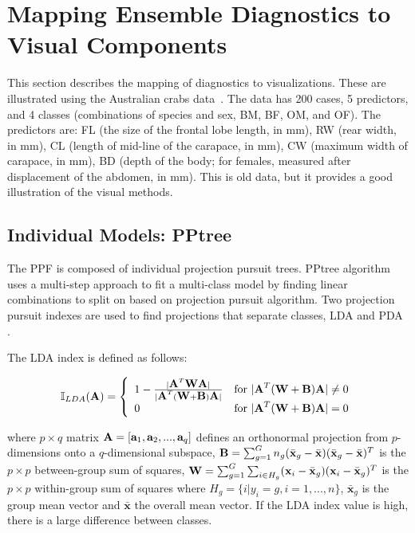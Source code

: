 \documentclass[smallextended,natbib]{svjour3}\usepackage[]{graphicx}\usepackage[]{xcolor}
\newcommand{\blA}{\mbox{\boldmath {\bf A}}}
\newcommand{\blB}{\mbox{\boldmath {\bf B}}}
\newcommand{\blW}{\mbox{\boldmath {\bf W}}}
\newcommand{\bla}{\mbox{\boldmath {\bf a}}}
\begin{document}
\section{Mapping Ensemble Diagnostics to Visual Components}
\label{visen}

This section describes the mapping of diagnostics to visualizations. These are illustrated using the Australian crabs data~\citep{CM74}. The data has 200 cases, 5 predictors, and 4 classes (combinations of species and sex, BM, BF, OM, and OF). The predictors are: FL (the size of the frontal lobe length, in mm), RW (rear width, in mm), CL (length of mid-line of the carapace, in mm), CW (maximum width of carapace, in mm), BD (depth of the body; for females, measured after displacement of the abdomen, in mm). This is old data, but it provides a good illustration of the visual methods.

\subsection{Individual Models: PPtree}

The PPF is composed of individual projection pursuit trees. PPtree algorithm uses a multi-step approach to fit a multi-class model by finding linear combinations to split on based on projection pursuit algorithm. Two projection pursuit indexes are used to find projections that separate classes,  LDA  \citep{lee2005projection} and PDA \citep{lee2010projection}.

The LDA index is defined as follows:

\begin{equation}
\label{lda}
 \mathbb{I}_{LDA}(\blA) = \left\{
  \begin{array}{l l}
    1-\frac{|\blA^T \blW\blA|}{|\blA^T(\blW+\blB)\blA|} &  \text{for}~|\blA^T(\blW+\blB)\blA|\neq 0\\
    0 &  \text{for}~|\blA^T(\blW+\blB)\blA|= 0
  \end{array} \right.
\end{equation}

\noindent where $p\times q$ matrix $\blA = [\bla_1, \bla_2 , . . . , \bla_q ]$ defines an orthonormal projection from $p$-dimensions onto a $q$-dimensional subspace, $\blB=\sum_{g=1}^G n_g(\bar{\mathbf{x}}_{g}-\bar{\mathbf{x}})(\bar{\mathbf{x}}_{g}-\bar{\mathbf{x}})^{T}$ is the $p\times p$ between-group sum of squares,
$\blW=\sum_{g=1}^{G}\sum_{i\in H_g}(\mathbf{x}_{i}-\bar{\mathbf{x}}_{g})(\mathbf{x}_{i}-\bar{\mathbf{x}}_{g})^T$ is the $p\times p$  within-group sum of squares where $H_g=\{i| y_i = g, i = 1, ..., n\}$, $\bar{\mathbf{x}}_{g}$ is the group mean vector and $\bar{\mathbf{x}}$ the overall mean vector. If the LDA index value is high, there is a large difference between classes.
\end{document}
